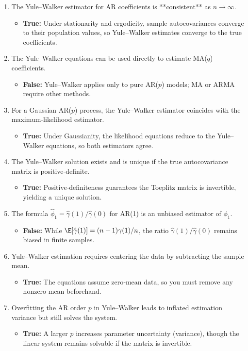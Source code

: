 \documentclass[11pt]{article}
\begin{document}
\begin{enumerate}
  \item The Yule–Walker estimator for AR coefficients is **consistent** as $n\to\infty$.
  \begin{itemize}
    \item \textbf{True:} Under stationarity and ergodicity, sample autocovariances converge to their population values, so Yule–Walker estimates converge to the true coefficients.
  \end{itemize}

  \item The Yule–Walker equations can be used directly to estimate MA($q$) coefficients.
  \begin{itemize}
    \item \textbf{False:} Yule–Walker applies only to pure AR($p$) models; MA or ARMA require other methods.
  \end{itemize}

  \item For a Gaussian AR($p$) process, the Yule–Walker estimator coincides with the maximum‐likelihood estimator.
  \begin{itemize}
    \item \textbf{True:} Under Gaussianity, the likelihood equations reduce to the Yule–Walker equations, so both estimators agree.
  \end{itemize}

  \item The Yule–Walker solution exists and is unique if the true autocovariance matrix is positive‐definite.
  \begin{itemize}
    \item \textbf{True:} Positive‐definiteness guarantees the Toeplitz matrix is invertible, yielding a unique solution.
  \end{itemize}

  \item The formula $\hat\phi_1 = \hat\gamma(1)/\hat\gamma(0)$ for AR(1) is an unbiased estimator of $\phi_1$.
  \begin{itemize}
    \item \textbf{False:} While $\E[\hat\gamma(1)] = (n-1)\gamma(1)/n$, the ratio $\hat\gamma(1)/\hat\gamma(0)$ remains biased in finite samples.
  \end{itemize}

  \item Yule–Walker estimation requires centering the data by subtracting the sample mean.
  \begin{itemize}
    \item \textbf{True:} The equations assume zero‐mean data, so you must remove any nonzero mean beforehand.
  \end{itemize}

  \item Overfitting the AR order $p$ in Yule–Walker leads to inflated estimation variance but still solves the system.
  \begin{itemize}
    \item \textbf{True:} A larger $p$ increases parameter uncertainty (variance), though the linear system remains solvable if the matrix is invertible.
  \end{itemize}
\end{enumerate}
\end{document}
